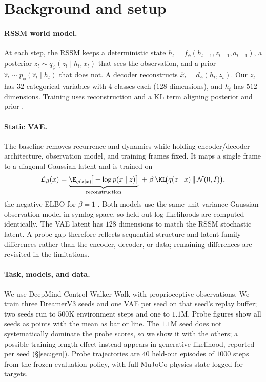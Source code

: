 \documentclass{article} %
\begin{document}
\section{Background and setup}
\label{sec:setup}

\paragraph{RSSM world model.} At each step, the RSSM keeps a deterministic state
$h_t=f_\phi(h_{t-1},z_{t-1},a_{t-1})$, a posterior
$z_t\sim q_\phi(z_t\mid h_t,x_t)$ that sees the observation, and a prior
$\hat z_t\sim p_\phi(\hat z_t\mid h_t)$ that does not. A decoder reconstructs
$\hat x_t=d_\phi(h_t,z_t)$. Our $z_t$ has $32$ categorical variables with $4$
classes each ($128$ dimensions), and $h_t$ has $512$ dimensions. Training uses
reconstruction and a KL term aligning posterior and prior
\citep{hafner2025dreamerv3}.

\paragraph{Static VAE.} The baseline removes recurrence and dynamics while
holding encoder/decoder architecture, observation model, and training frames
fixed. It maps a single frame to a diagonal-Gaussian latent and is trained on
\begin{equation}
\mathcal{L}_\beta(x) = \underbrace{\E_{q(z\mid x)}\!\big[-\log p(x\mid z)\big]}_{\text{reconstruction}}
\;+\; \beta\,\KL\!\big(q(z\mid x)\,\Vert\,\mathcal{N}(0,I)\big),
\label{eq:elbo}
\end{equation}
the negative ELBO for $\beta{=}1$ \citep{kingma2014vae,higgins2017betavae}. Both
models use the same unit-variance Gaussian observation model in symlog space, so
held-out log-likelihoods are computed identically. The VAE latent has $128$
dimensions to match the RSSM stochastic latent. A probe gap therefore reflects
sequential structure and latent-family differences rather than the encoder,
decoder, or data; remaining differences are revisited in the limitations.

\paragraph{Task, models, and data.} We use DeepMind Control Walker-Walk
\citep{tassa2018dmc} with proprioceptive observations. We train three DreamerV3
seeds and one VAE per seed on that seed's replay buffer; two seeds run to $500$K
environment steps and one to $1.1$M. Probe figures show all seeds as points with
the mean as bar or line. The $1.1$M seed does not systematically dominate the
probe scores, so we show it with the others; a possible training-length effect
instead appears in generative likelihood, reported per seed (\S\ref{sec:gen}).
Probe trajectories are $40$ held-out episodes of
$1000$ steps from the frozen evaluation policy, with full MuJoCo physics state
logged for targets.
\end{document}
